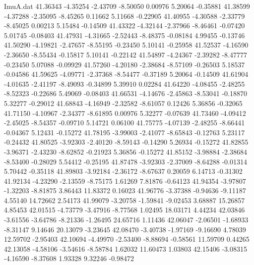 \begin{filecontents}{ImuA.dat}
  41.36343   -4.35254   -2.43709   -8.50050    0.00976    5.20064   -0.35881
  41.38599   -4.37288   -2.35095   -8.45265    0.11662    5.11668   -0.22905
  41.40955   -4.30588   -2.33779   -8.45025    0.00213    5.15484   -0.14509
  41.43322   -4.32144   -2.37966   -8.46461   -0.07420    5.01745   -0.08403
  41.47931   -4.31665   -2.52443   -8.48375   -0.08184    4.99455   -0.13746
  41.50290   -4.19821   -2.47657   -8.55195   -0.23450    5.10141   -0.25958
  41.52537   -4.16590   -2.36650   -8.55434   -0.15817    5.10141   -0.22142
  41.54897   -4.24367   -2.39282   -8.47777   -0.23450    5.07088   -0.09929
  41.57260   -4.20180   -2.38684   -8.57109   -0.26503    5.18537   -0.04586
  41.59625   -4.09771   -2.37368   -8.54477   -0.37189    5.20064   -0.14509
  41.61904   -4.01635   -2.41197   -8.49093   -0.34899    5.39910    0.02284
  41.64220   -4.08455   -2.48255   -8.52323   -0.22686    5.49069   -0.08403
  41.66531   -4.14676   -2.45863   -8.53041   -0.18870    5.32277   -0.29012
  41.68843   -4.16949   -2.32582   -8.61057    0.12426    5.36856   -0.32065
  41.71150   -4.10967   -2.34377   -8.61895    0.00976    5.32277   -0.07639
  41.73460   -4.09412   -2.45025   -8.54357   -0.09710    5.14721    0.06100
  41.75775   -4.07139   -2.48255   -8.66441   -0.04367    5.12431   -0.15272
  41.78195   -3.99003   -2.41077   -8.65843   -0.12763    5.23117   -0.24432
  41.80525   -3.92303   -2.40120   -8.59143   -0.14290    5.26934   -0.15272
  41.82855   -3.96371   -2.43230   -8.62852   -0.21923    5.36856   -0.15272
  41.85152   -3.98884   -2.38684   -8.53400   -0.28029    5.54412   -0.25195
  41.87478   -3.92303   -2.37009   -8.64288   -0.01314    5.70442   -0.35118
  41.89803   -3.92184   -2.36172   -8.67637    0.20059    6.14713   -0.31302
  41.92134   -4.23290   -2.13559   -8.75175    1.61269    7.81876   -0.64123
  41.94354   -3.97807   -1.32203   -8.81875    3.86443   11.83372    0.16023
  41.96776   -3.37388   -0.94636   -9.11187    4.55140   14.72662    2.54173
  41.99079   -3.20758   -1.59841   -9.02453    3.68887   15.26857    4.85453
  42.01515   -4.73779   -3.47916   -8.77568    1.02495   18.03171    4.44234
  42.03846   -3.61556   -3.64786   -8.21336   -1.26495   24.65716    1.11436
  42.06047   -2.06501   -1.68933   -8.31147    9.14646   20.13079   -3.23645
  42.08470   -3.40738   -1.97169   -9.16690    4.78039   12.59702   -2.95403
  42.10694   -4.49970   -2.53400   -8.88694   -0.58561   11.59709    0.44265
  42.13058   -4.58106   -3.54616   -8.58784    1.62032   11.60473    1.03803
  42.15406   -3.08315   -4.16590   -8.37608    1.93328    9.32246   -0.98472

\end{filecontents}
